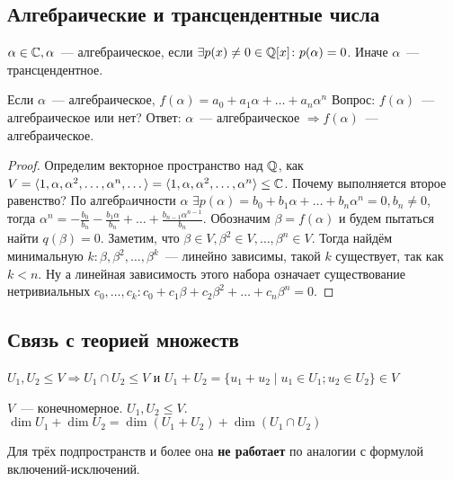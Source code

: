 \subsection{Алгебраические и трансцендентные числа}
\begin{definition}
$\alpha\in\mathbb{C}, \alpha$~--- алгебраическое, если $\exists p(x)\not=0\in\mathbb{Q}[x] \colon p(\alpha)=0$.
Иначе $\alpha$~--- трансцендентное.
\end{definition}
Если $\alpha$~--- алгебраическое, $f(\alpha) = a_0 + a_1\alpha + \dots + a_n\alpha^n$
Вопрос: $f(\alpha)$~--- алгебраическое или нет?
Ответ:
$\alpha$~--- алгебраическое $\Rightarrow f(\alpha)$~--- алгебраическое.
\begin{proof}
    Определим векторное пространство над $\mathbb{Q}$, как $V = \langle1, \alpha, \alpha^2,\dots,\alpha^n,\dots\rangle = \langle1, \alpha, \alpha^2,\dots,\alpha^n\rangle \le \mathbb{C}$.
    Почему выполняется второе равенство?
    По алгебрaичности $\alpha$ $\exists p(\alpha) = b_0+b_1\alpha+\dots+b_n\alpha^n = 0, b_n\not=0$, тогда
    $\alpha^n = -\frac{b_0}{b_n} - \frac{b_1\alpha}{b_n} + \dots + \frac{b_{n-1}\alpha^{n-1}}{b_n}$.
    Обозначим $\beta = f(\alpha)$ и будем пытаться найти $q(\beta)=0$.
    Заметим, что $\beta\in V, \beta^2\in V,\dots,\beta^n\in V$. 
    Тогда найдём минимальную $k: \beta,\beta^2,\dots,\beta^k$~--- линейно зависимы, такой $k$ существует, так как $k < n$. Ну а линейная зависимость этого набора означает существование нетривиальных 
    $c_0,\dots, c_k\colon c_0 + c_1\beta + c_2\beta^2 + \dots + c_n\beta^n=0$.
\end{proof}
\subsection{Связь с теорией множеств}
\begin{definition}
    $U_1, U_2\leq V \Rightarrow U_1\cap U_2 \leq V$ и $U_1+U_2 =
    \{u_1+u_2\mid u_1\in U_1; u_2\in U_2\}\in V$
\end{definition}
\begin{theorem}
$V$~--- конечномерное. $U_1, U_2\leq V$. 
$\dim U_1 + \dim U_2 = \dim(U_1+U_2) + \dim(U_1\cap U_2)$
\end{theorem}
\begin{remark}
Для трёх подпространств и более она \textbf{не работает} по аналогии с формулой включений-исключений.
\end{remark}
